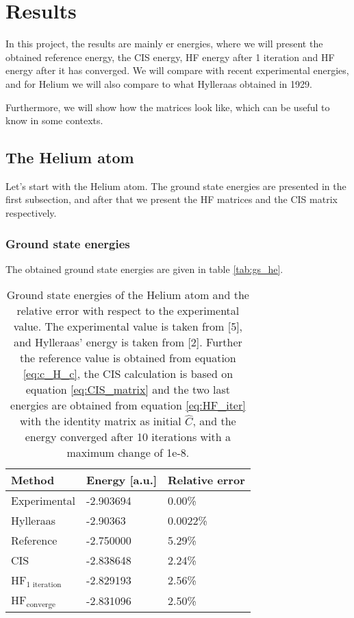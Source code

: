\section{Results} \label{sec:results}
In this project, the results are mainly er energies, where we will present the obtained reference energy, the CIS energy, HF energy after 1 iteration and HF energy after it has converged. We will compare with recent experimental energies, and for Helium we will also compare to what Hylleraas obtained in 1929. 

Furthermore, we will show how the matrices look like, which can be useful to know in some contexts. 

\subsection{The Helium atom}
Let's start with the Helium atom. The ground state energies are presented in the first subsection, and after that we present the HF matrices and the CIS matrix respectively. 

\subsubsection{Ground state energies}
The obtained ground state energies are given in table \eqref{tab:gs_he}.
\begin{table} [H]
	\caption{Ground state energies of the Helium atom and the relative error with respect to the experimental value. The experimental value is taken from [5], and Hylleraas' energy is taken from [2]. Further the reference value is obtained from equation \eqref{eq:c_H_c}, the CIS calculation is based on equation \eqref{eq:CIS_matrix} and the two last energies are obtained from equation \eqref{eq:HF_iter} with the identity matrix as initial $\hat{C}$, and the energy converged after 10 iterations with a maximum change of 1e-8.}
	\begin{tabularx}{\textwidth}{X|X|X} \hline\hline
		\textbf{Method}&\textbf{Energy} [a.u.]&\textbf{Relative error}\\ \hline
		Experimental & -2.903694 & 0.00\%  \\
		Hylleraas & -2.90363 & 0.0022\% \\
		Reference & -2.750000 & 5.29\% \\
		CIS & -2.838648 &  2.24\% \\
		HF$_{\text{1 iteration}}$ & -2.829193 & 2.56\% \\
		HF$_{\text{converge}}$ & -2.831096 & 2.50\% \\ \hline\hline
	\end{tabularx}
	\label{tab:gs_he}
\end{table}

